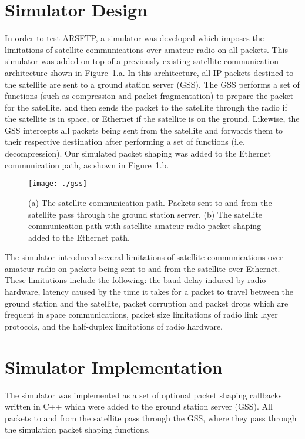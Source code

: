 \documentclass[journal]{./IEEEtran}
\begin{document}
\section{Simulator Design}

In order to test ARSFTP, a simulator was developed which imposes the limitations of satellite communications over amateur radio on all packets.  This simulator was added on top of a previously existing satellite communication architecture shown in Figure~\ref{fig_gss}.a.  In this architecture, all IP packets destined to the satellite are sent to a ground station server (GSS).  The GSS performs a set of functions (such as compression and packet fragmentation) to prepare the packet for the satellite, and then sends the packet to the satellite through the radio if the satellite is in space, or Ethernet if the satellite is on the ground.  Likewise, the GSS intercepts all packets being sent from the satellite and forwards them to their respective destination after performing a set of functions (i.e. decompression).  Our simulated packet shaping was added to the Ethernet communication path, as shown in Figure~\ref{fig_gss}.b.  

\begin{figure}[h!]
\begin{center}
\texttt{[image: ./gss]}
\end{center}
\caption{(a) The satellite communication path.  Packets sent to and from the satellite pass through the ground station server. (b) The satellite communication path with satellite amateur radio packet shaping added to the Ethernet path.}
\label{fig_gss}
\end{figure}

The simulator introduced several limitations of satellite communications over amateur radio on packets being sent to and from the satellite over Ethernet.  These limitations include the following: the baud delay induced by radio hardware, latency caused by the time it takes for a packet to travel between the ground station and the satellite, packet corruption and packet drops which are frequent in space communications, packet size limitations of radio link layer protocols, and the half-duplex limitations of radio hardware.   

\section{Simulator Implementation}
The simulator was implemented as a set of optional packet shaping callbacks written in C++ which were added to the ground station server (GSS).  All packets to and from the satellite pass through the GSS, where they pass through the simulation packet shaping functions.
\end{document}
